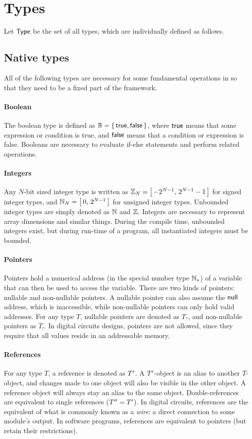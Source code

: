 \section{Types}
Let $\mathsf{Type}$ be the set of all types, which are individually defined as follows.

\subsection{Native types}
All of the following types are necessary for some fundamental operations in {\tetra} so that they need to be a fixed part of the framework.

\paragraph{Boolean}
The boolean type is defined as $\mathbb{B} = \left\{\,\mathsf{true}, \mathsf{false}\,\right\}$, where $\mathsf{true}$ means that some expression or condition is true, and $\mathsf{false}$ means that a condition or expression is false.
Booleans are necessary to evaluate if-else statements and perform related operations.

\paragraph{Integers}
Any $N$-bit sized integer type is written as $\mathbb{Z}_N = \left[\,-2^{N-1},\, 2^{N-1}-1\,\right]$ for signed integer types, and $\mathbb{N}_N = \left[\,0,\,2^{N-1}\,\right]$ for unsigned integer types.
Unbounded integer types are simply denoted as $\mathbb{N}$ and $\mathbb{Z}$.
Integers are necessary to represent array dimensions and similar things.
During the compile time, unbounded integers exist, but during run-time of a program, all instantiated integers must be bounded.

\paragraph{Pointers}
Pointers hold a numerical address (in the special number type $\mathbb{N}_*$) of a variable that can then be used to access the variable.
There are two kinds of pointers: nullable and non-nullable pointers.
A nullable pointer can also assume the $\mathsf{null}$ address, which is inaccessible, while non-nullable pointers can only hold valid addresses.
For any type $T$, nullable pointers are denoted as $T_?$, and non-nullable pointers as $T_!$.
In digital circuits designs, pointers are not allowed, since they require that all values reside in an addressable memory.

\paragraph{References}
For any type $T$, a reference is denoted as $T'$.
A $T'$-object is an alias to another $T$-object, and changes made to one object will also be visible in the other object.
A reference object will always stay an alias to the same object.
Double-references are equivalent to single references ($T''=T'$).
In digital circuits, references are the equivalent of what is commonly known as a \emph{wire}: a direct connection to some module's output.
In software programs, references are equivalent to pointers (but retain their restrictions).

